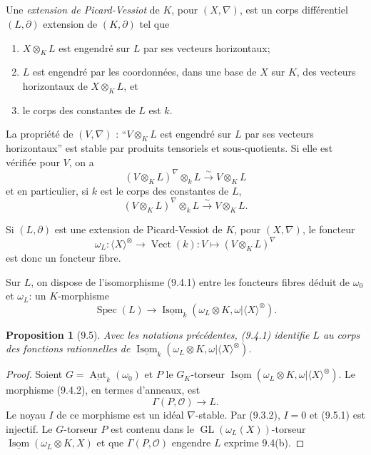 \documentclass[12pt,a4paper]{article}
\theoremstyle{plain}
\newtheorem{proposition}[theorem]{Proposition}
\theoremstyle{definition}
\DeclareMathOperator{\Spec}{Spec}
\DeclareMathOperator{\Aut}{Aut}
\DeclareMathOperator{\Isom}{Isom}
\DeclareMathOperator{\Vect}{Vect}
\DeclareMathOperator{\GL}{GL}
\begin{document}
\subsection{}

Une \emph{extension de Picard-Vessiot} de $K$, pour $(X, \nabla)$, est un corps différentiel $(L, \partial)$ extension de $(K, \partial)$ tel que
\begin{enumerate}
\item[(a)] $X \otimes_K L$ est engendré sur $L$ par ses vecteurs horizontaux;
\item[(b)] $L$ est engendré par les coordonnées, dans une base de $X$ sur $K$, des vecteurs horizontaux de $X \otimes_K L$, et
\item[(c)] le corps des constantes de $L$ est $k$.
\end{enumerate}

La propriété de $(V, \nabla)$ : ``$V \otimes_K L$ est engendré sur $L$ par ses vecteurs horizontaux'' est stable par produits tensoriels et sous-quotients. Si elle est vérifiée pour $V$, on a
\[
(V \otimes_K L)^\nabla \otimes_k L \xrightarrow{\sim} V \otimes_K L
\]
et en particulier, si $k$ est le corps des constantes de $L$,
\[
(V \otimes_K L)^\nabla \otimes_k L \xrightarrow{\sim} V \otimes_K L.
\]

Si $(L, \partial)$ est une extension de Picard-Vessiot de $K$, pour $(X, \nabla)$, le foncteur
\[
\omega_L : \langle X \rangle^\otimes \to \Vect(k) : V \mapsto (V \otimes_K L)^\nabla
\]
est donc un foncteur fibre.

Sur $L$, on dispose de l'isomorphisme (9.4.1) entre les foncteurs fibres déduit de $\omega_0$ et $\omega_L$: un $K$-morphisme
\begin{equation}\label{eq:9.4.2}
\Spec(L) \to \underline{\Isom}_k(\omega_L \otimes K, \omega | \langle X \rangle^\otimes).
\end{equation}

\begin{proposition}[9.5]
Avec les notations précédentes, (9.4.1) identifie $L$ au corps des fonctions rationnelles de $\underline{\Isom}_k(\omega_L \otimes K, \omega | \langle X \rangle^\otimes)$.
\end{proposition}

\begin{proof}
Soient $G = \underline{\Aut}_k(\omega_0)$ et $P$ le $G_K$-torseur $\underline{\Isom}(\omega_L \otimes K, \omega | \langle X \rangle^\otimes)$. Le morphisme (9.4.2), en termes d'anneaux, est
\begin{equation}\label{eq:9.5.1}
\Gamma(P, \mathcal{O}) \to L.
\end{equation}
Le noyau $I$ de ce morphisme est un idéal $\nabla$-stable. Par (9.3.2), $I = 0$ et (9.5.1) est injectif. Le $G$-torseur $P$ est contenu dans le $\GL(\omega_L(X))$-torseur $\underline{\Isom}(\omega_L \otimes K, X)$ et que $\Gamma(P, \mathcal{O})$ engendre $L$ exprime 9.4(b).
\end{proof}
\end{document}
